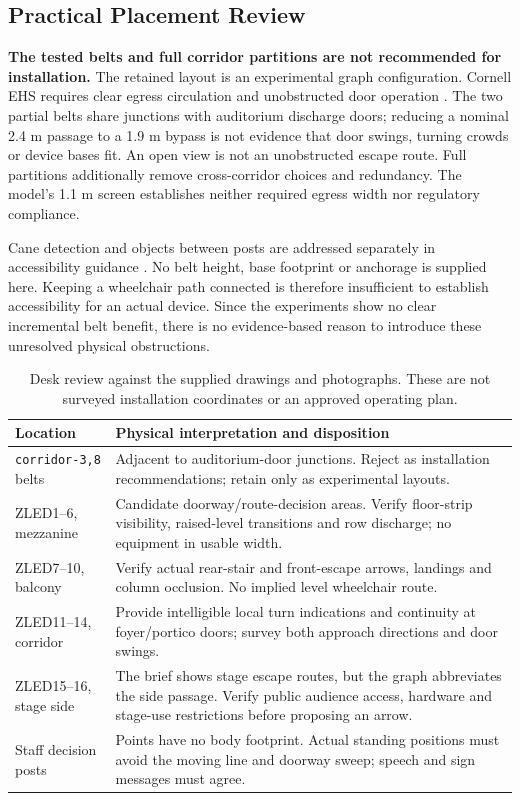 \subsection{Practical Placement Review}\label{sec:practical-review}

\textbf{The tested belts and full corridor partitions are not recommended for installation.} The retained layout is an experimental graph configuration. Cornell EHS requires clear egress circulation and unobstructed door operation \cite{cornellsetup}. The two partial belts share junctions with auditorium discharge doors; reducing a nominal 2.4 m passage to a 1.9 m bypass is not evidence that door swings, turning crowds or device bases fit. An open view is not an unobstructed escape route. Full partitions additionally remove cross-corridor choices and redundancy. The model's 1.1 m screen establishes neither required egress width nor regulatory compliance.

Cane detection and objects between posts are addressed separately in accessibility guidance \cite{adaprotrusions}. No belt height, base footprint or anchorage is supplied here. Keeping a wheelchair path connected is therefore insufficient to establish accessibility for an actual device. Since the experiments show no clear incremental belt benefit, there is no evidence-based reason to introduce these unresolved physical obstructions.

\begin{table}[htbp]\centering\small
\begin{tabularx}{\linewidth}{p{.24\linewidth}X}\toprule
Location & Physical interpretation and disposition\\\midrule
\texttt{corridor-3,8} belts & Adjacent to auditorium-door junctions. Reject as installation recommendations; retain only as experimental layouts.\\
ZLED1--6, mezzanine & Candidate doorway/route-decision areas. Verify floor-strip visibility, raised-level transitions and row discharge; no equipment in usable width.\\
ZLED7--10, balcony & Verify actual rear-stair and front-escape arrows, landings and column occlusion. No implied level wheelchair route.\\
ZLED11--14, corridor & Provide intelligible local turn indications and continuity at foyer/portico doors; survey both approach directions and door swings.\\
ZLED15--16, stage side & The brief shows stage escape routes, but the graph abbreviates the side passage. Verify public audience access, hardware and stage-use restrictions before proposing an arrow.\\
Staff decision posts & Points have no body footprint. Actual standing positions must avoid the moving line and doorway sweep; speech and sign messages must agree.\\\bottomrule
\end{tabularx}
\caption{Desk review against the supplied drawings and photographs. These are not surveyed installation coordinates or an approved operating plan.}
\end{table}

